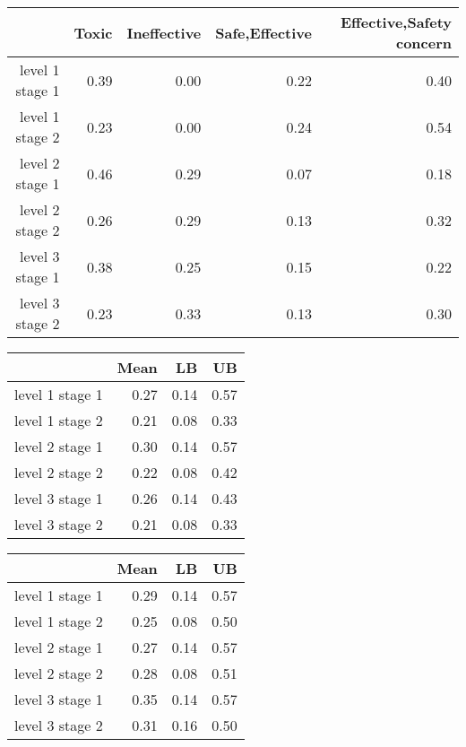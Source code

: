 \documentclass[]{article}
\begin{document}
\begin{table}[ht]
\centering
\begin{tabular}{rrrrr}
  \hline
 & Toxic & Ineffective & Safe,Effective & Effective,Safety concern \\ 
  \hline
level 1 stage 1 & 0.39 & 0.00 & 0.22 & 0.40 \\ 
  level 1 stage 2 & 0.23 & 0.00 & 0.24 & 0.54 \\ 
  level 2 stage 1 & 0.46 & 0.29 & 0.07 & 0.18 \\ 
  level 2 stage 2 & 0.26 & 0.29 & 0.13 & 0.32 \\ 
  level 3 stage 1 & 0.38 & 0.25 & 0.15 & 0.22 \\ 
  level 3 stage 2 & 0.23 & 0.33 & 0.13 & 0.30 \\ 
   \hline
\end{tabular}
\end{table}
\begin{table}[ht]
\centering
\begin{tabular}{rrrr}
  \hline
 & Mean & LB & UB \\ 
  \hline
level 1 stage 1 & 0.27 & 0.14 & 0.57 \\ 
  level 1 stage 2 & 0.21 & 0.08 & 0.33 \\ 
  level 2 stage 1 & 0.30 & 0.14 & 0.57 \\ 
  level 2 stage 2 & 0.22 & 0.08 & 0.42 \\ 
  level 3 stage 1 & 0.26 & 0.14 & 0.43 \\ 
  level 3 stage 2 & 0.21 & 0.08 & 0.33 \\ 
   \hline
\end{tabular}
\end{table}
\begin{table}[ht]
\centering
\begin{tabular}{rrrr}
  \hline
 & Mean & LB & UB \\ 
  \hline
level 1 stage 1 & 0.29 & 0.14 & 0.57 \\ 
  level 1 stage 2 & 0.25 & 0.08 & 0.50 \\ 
  level 2 stage 1 & 0.27 & 0.14 & 0.57 \\ 
  level 2 stage 2 & 0.28 & 0.08 & 0.51 \\ 
  level 3 stage 1 & 0.35 & 0.14 & 0.57 \\ 
  level 3 stage 2 & 0.31 & 0.16 & 0.50 \\ 
   \hline
\end{tabular}
\end{table}
\end{document}
